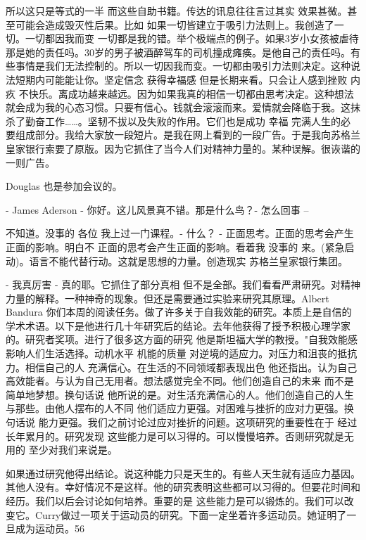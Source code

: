 所以这只是等式的一半 而这些自助书籍。传达的讯息往往言过其实 效果甚微。甚至可能会造成毁灭性后果。比如 如果一切皆建立于吸引力法则上。我创造了一切。一切都因我而变 一切都是我的错。举个极端点的例子。如果3岁小女孩被虐待 那是她的责任吗。30岁的男子被酒醉驾车的司机撞成瘫痪。是他自己的责任吗。有些事情是我们无法控制的。所以一切因我而变。一切都由吸引力法则决定。这种说法短期内可能能让你。坚定信念 获得幸福感 但是长期来看。只会让人感到挫败 内疚 不快乐。离成功越来越远。因为如果我真的相信一切都由思考决定。这种想法就会成为我的心态习惯。只要有信心。钱就会滚滚而来。爱情就会降临于我。这抹杀了勤奋工作……。坚韧不拔以及失败的作用。它们也是成功 幸福 完满人生的必要组成部分。我给大家放一段短片。是我在网上看到的一段广告。于是我向苏格兰皇家银行索要了原版。因为它抓住了当今人们对精神力量的。某种误解。很诙谐的一则广告。 

Douglas 也是参加会议的。 

- James Aderson - 你好。这儿风景真不错。那是什么鸟？- 怎么回事 – 

不知道。没事的 各位 我上过一门课程。- 什么？ - 正面思考。正面的思考会产生正面的影响。明白不 正面的思考会产生正面的影响。看着我 没事的 来。(紧急启动)。语言不能代替行动。这就是思想的力量。创造现实 苏格兰皇家银行集团。 

- 我真厉害 - 真的耶。它抓住了部分真相 但不是全部。我们看看严肃研究。对精神力量的解释。一种神奇的现象。但还是需要通过实验来研究其原理。Albert Bandura 你们本周的阅读任务。做了许多关于自我效能的研究。本质上是自信的学术术语。以下是他进行几十年研究后的结论。去年他获得了授予积极心理学家的。研究者奖项。进行了很多这方面的研究 他是斯坦福大学的教授。"自我效能感影响人们生活选择。动机水平 机能的质量 对逆境的适应力。对压力和沮丧的抵抗力。相信自己的人 充满信心。在生活的不同领域都表现出色 他还指出。认为自己高效能者。与认为自己无用者。想法感觉完全不同。他们创造自己的未来 而不是简单地梦想。换句话说 他所说的是。对生活充满信心的人。他们创造自己的人生 与那些。由他人摆布的人不同 他们适应力更强。对困难与挫折的应对力更强。换句话说 能力更强。我们之前讨论过应对挫折的问题。这项研究的重要性在于 经过长年累月的。研究发现 这些能力是可以习得的。可以慢慢培养。否则研究就是无用的 至少对我们来说是。 

如果通过研究他得出结论。说这种能力只是天生的。有些人天生就有适应力基因。其他人没有。幸好情况不是这样。他的研究表明这些都可以习得的。但要花时间和经历。我们以后会讨论如何培养。重要的是 这些能力是可以锻炼的。我们可以改变它。Curry做过一项关于运动员的研究。下面一定坐着许多运动员。她证明了一旦成为运动员。56%

